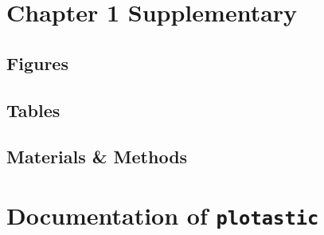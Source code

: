 \documentclass[12pt]{doctoral_thesis_uniwue}
\begin{document}
\newpage

\appendix
\appendixpage
\addappheadtotoc


\captionsetup[figure]{labelformat=appendixfigure} %
\captionsetup[table]{labelformat=appendixtable} %

\begin{appendices}
    \pagestyle{appendix} %
    
    \section{Chapter 1 Supplementary}\label{apdx:supplemental}
    \resetcounters %

    \subsection{Figures}\label{subapdx:figs}
    \newpage
    
    \newpage
    
    \subsection{Tables}\label{subapdx:tabs}
    \newpage
    
    \newpage
    
    \subsection{Materials \& Methods}\label{subapdx:methods}
    \newpage
    
    \newpage
    


    \section{Documentation of \texttt{plotastic}}\label{apdx:plotastic_docs}
    \resetcounters %
    
    \newpage

    
    
    \newpage

\end{appendices}



\end{document}
